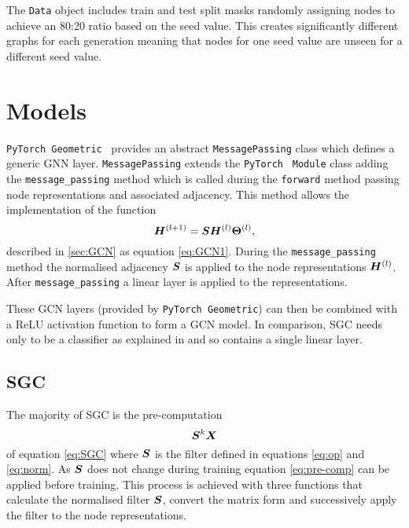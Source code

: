 The \texttt{Data} object includes train and test split masks randomly assigning nodes to achieve an 80:20 ratio based on the seed value.
This creates significantly different graphs for each generation meaning that nodes for one seed value are unseen for a different seed value.

\section{Models}
\label{sec:models}

\texttt{PyTorch Geometric}~\cite{Fey/Lenssen/2019} provides an abstract \texttt{MessagePassing} class which defines a generic GNN layer.
\texttt{MessagePassing} extends the \texttt{PyTorch}~\cite{paszke2019pytorch} \texttt{Module} class adding the \texttt{message\_passing} method which is called during the \texttt{forward} method passing node representations and associated adjacency.
This method allows the implementation of the function
\begin{equation}
    {\bm{H}}^{(l+1)} = {\bm{S}}{\bm{H}}^{(l)}\bm{\Theta}^{(l)},
\end{equation}
described in \ref{sec:GCN} as equation \ref{eq:GCN1}.
During the \texttt{message\_passing} method the normalised adjacency ${\bm{S}}$ is applied to the node representations ${\bm{H}}^{(l)}$.
After \texttt{message\_passing} a linear layer is applied to the representations.

These GCN layers (provided by \texttt{PyTorch Geometric}) can then be combined with a ReLU activation function to form a GCN model.
In comparison, SGC needs only to be a classifier as explained in  and so contains a single linear layer.

\subsection{SGC}
The majority of SGC is the pre-computation
\begin{equation}
    \label{eq:pre-comp}
    {\bm{S}}^k{\bm{X}}
\end{equation}
of equation \ref{eq:SGC} where ${\bm{S}}$ is the filter defined in equations \ref{eq:op} and \ref{eq:norm}.
As ${\bm{S}}$ 
does not change during training equation \ref{eq:pre-comp} can be applied before training.
This process is achieved with three functions that calculate the normalised filter ${\bm{S}}$,
convert the matrix form and successively apply the filter to the node representations.

